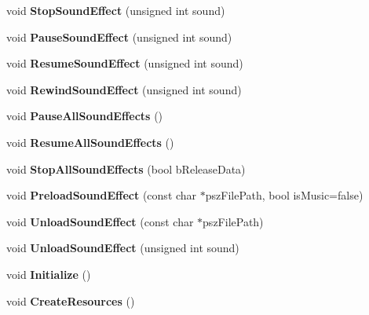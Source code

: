 \begin{DoxyCompactItemize}
void {\bfseries Stop\+Sound\+Effect} (unsigned int sound)
\item 
\mbox{\label{classAudio_ae2f138e9605d9bbfb77035d04b69962f}} 
void {\bfseries Pause\+Sound\+Effect} (unsigned int sound)
\item 
\mbox{\label{classAudio_abf92ba47cc071f8effa0c6cb7689c3bb}} 
void {\bfseries Resume\+Sound\+Effect} (unsigned int sound)
\item 
\mbox{\label{classAudio_a962a1556c4b9e1b7375d2dd5935314ef}} 
void {\bfseries Rewind\+Sound\+Effect} (unsigned int sound)
\item 
\mbox{\label{classAudio_a6def6b283db6e36cd0f0a9751a7d0750}} 
void {\bfseries Pause\+All\+Sound\+Effects} ()
\item 
\mbox{\label{classAudio_a05c919f64f2b5ad31e624a1a0dee4c75}} 
void {\bfseries Resume\+All\+Sound\+Effects} ()
\item 
\mbox{\label{classAudio_a847f4085b2427fc350407af398e08ee8}} 
void {\bfseries Stop\+All\+Sound\+Effects} (bool b\+Release\+Data)
\item 
\mbox{\label{classAudio_a98a5364325e02d295b660606b9b8955e}} 
void {\bfseries Preload\+Sound\+Effect} (const char $\ast$psz\+File\+Path, bool is\+Music=false)
\item 
\mbox{\label{classAudio_ad8b721bdab612fac8598fce1a9243d7a}} 
void {\bfseries Unload\+Sound\+Effect} (const char $\ast$psz\+File\+Path)
\item 
\mbox{\label{classAudio_ad6f98b0ed6916b5ed29ec16129dce89c}} 
void {\bfseries Unload\+Sound\+Effect} (unsigned int sound)
\item 
\mbox{\label{classAudio_a8d7f6a57c5c356d8d7f081131f6847ed}} 
void {\bfseries Initialize} ()
\item 
\mbox{\label{classAudio_a11058ecdf78a58033843d782aa5a9044}} 
void {\bfseries Create\+Resources} ()
\item 
\mbox{\label{classAudio_a607dfc560f2d305c82155573c55833d3}} 

\end{DoxyCompactItemize}
